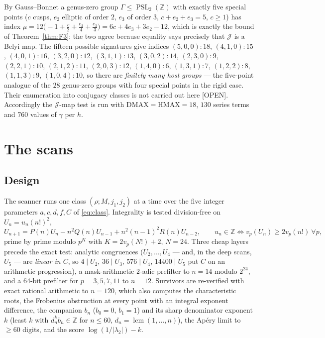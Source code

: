 \documentclass[11pt,reqno]{amsart}
\theoremstyle{plain}
\theoremstyle{definition}
\theoremstyle{remark}
\theoremstyle{plain}
\newcommand{\Z}{\mathbb{Z}}
\DeclareMathOperator{\PSL}{PSL}
\newcommand{\Jm}{\mathcal J}
\newcommand{\Open}{\textup{\textsf{[OPEN]}}}
\begin{document}
By Gauss--Bonnet a genus-zero group $\Gamma\le\PSL_2(\Z)$ with exactly five
special points ($c$ cusps, $e_2$ elliptic of order $2$, $e_3$ of order $3$,
$c+e_2+e_3=5$, $c\ge1$) has index
$\mu=12\bigl(-1+\tfrac c2+\tfrac{e_2}4+\tfrac{e_3}3\bigr)=6c+4e_3+3e_2-12$,
which is exactly the bound of Theorem~\ref{thm:F3}: the two agree because
equality says precisely that $\Jm$ is a Belyi map. The fifteen possible
signatures give indices
$(5,0,0)\!:\!18$, $(4,1,0)\!:\!15$, $(4,0,1)\!:\!16$, $(3,2,0)\!:\!12$,
$(3,1,1)\!:\!13$, $(3,0,2)\!:\!14$, $(2,3,0)\!:\!9$, $(2,2,1)\!:\!10$,
$(2,1,2)\!:\!11$, $(2,0,3)\!:\!12$, $(1,4,0)\!:\!6$, $(1,3,1)\!:\!7$,
$(1,2,2)\!:\!8$, $(1,1,3)\!:\!9$, $(1,0,4)\!:\!10$,
so there are \emph{finitely many host groups} --- the five-point analogue of the
$28$ genus-zero groups with four special points in the rigid case. Their
enumeration into conjugacy classes is not carried out here \Open. Accordingly
the $\Jm$-map test is run with $\mathrm{DMAX}=\mathrm{HMAX}=18$, $130$ series
terms and $760$ values of $\gamma$ per $h$.

\section{The scans}\label{sec:scans}

\subsection{Design}
The scanner runs one class $(\rho;M,j_1,j_2)$ at a time over the five integer
parameters $a,c,d,f,C$ of \eqref{eq:class}. Integrality is tested
division-free on $U_n=u_n(n!)^2$,
\[
U_{n+1}=P(n)U_n-n^2Q(n)U_{n-1}+n^2(n-1)^2R(n)U_{n-2},\qquad
u_n\in\Z\iff v_p(U_n)\ge2v_p(n!)\ \forall p,
\]
prime by prime modulo $p^K$ with $K=2v_p(N!)+2$, $N=24$. Three cheap layers
precede the exact test: analytic congruences ($U_2,\dots,U_4$ --- and, in the
deep scans, $U_5$ --- are \emph{linear in $C$}, so $4\mid U_2$, $36\mid U_3$,
$576\mid U_4$, $14400\mid U_5$ put $C$ on an arithmetic progression), a
mask-arithmetic $2$-adic prefilter to $n=14$ modulo $2^{24}$, and a 64-bit
prefilter for $p=3,5,7,11$ to $n=12$. Survivors are
re-verified with exact rational arithmetic to $n=120$, which also computes the
characteristic roots, the Frobenius obstruction at every point with an integral
exponent difference, the companion $b_n$ ($b_0=0$, $b_1=1$) and its sharp
denominator exponent $k$ (least $k$ with $d_n^kb_n\in\Z$ for $n\le60$,
$d_n=\operatorname{lcm}(1,\dots,n)$), the Ap\'ery limit to $\ge60$ digits, and
the score $\log(1/|\lambda_2|)-k$.
\end{document}
